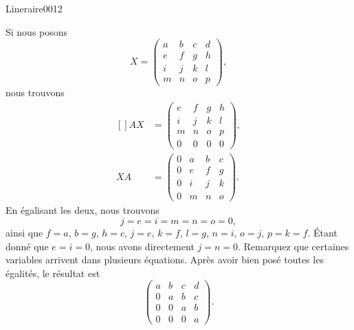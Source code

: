 \begin{corrige}{Lineraire0012}

	Si nous posons 
	\begin{equation}
		X=\begin{pmatrix}
			 a	&	b	&	c	&	d	\\ 
			  e	&	f	&	g	&	h	\\
			   i	&	j	&	k	&	l	\\ 
			    m	&	n	&	o	&	p		 
			     \end{pmatrix},
	\end{equation}
	nous trouvons
	\begin{equation}
		\begin{aligned}[]
			AX&=\begin{pmatrix}
				 e	&	f	&	g	&	h	\\
				 i	&	j	&	k	&	l	\\
				 m	&	n	&	o	&	p	\\ 
				  0	&	0	&	0	&	0	 
				   \end{pmatrix},\\
			XA&=\begin{pmatrix}
				 0	&	a	&	b	&	c	\\
				 0	&	e	&	f	&	g	\\
				 0	&	i	&	j	&	k	\\ 
				 0	&	m	&	n	&	o	 
				  \end{pmatrix}.
		\end{aligned}
	\end{equation}
	En égalisant les deux, nous trouvons
	\begin{equation}
		j=e=i=m=n=o=0,
	\end{equation}
	ainsi que $f=a$, $b=g$, $h=c$, $j=e$, $k=f$, $l=g$, $n=i$, $o=j$, $p=k=f$. Étant donné que $e=i=0$, nous avons directement $j=n=0$. Remarquez que certaines variables arrivent dans plusieurs équations. Après avoir bien posé toutes les égalités, le résultat est
	\begin{equation}
		\begin{pmatrix}
			 a	&	b	&	c	&	d	\\
			 0	&	a	&	b	&	c	\\
			 0	&	0	&	a	&	b	\\ 
			 0	&	0	&	0	&	a	 
			  \end{pmatrix}.
	\end{equation}

\end{corrige}
